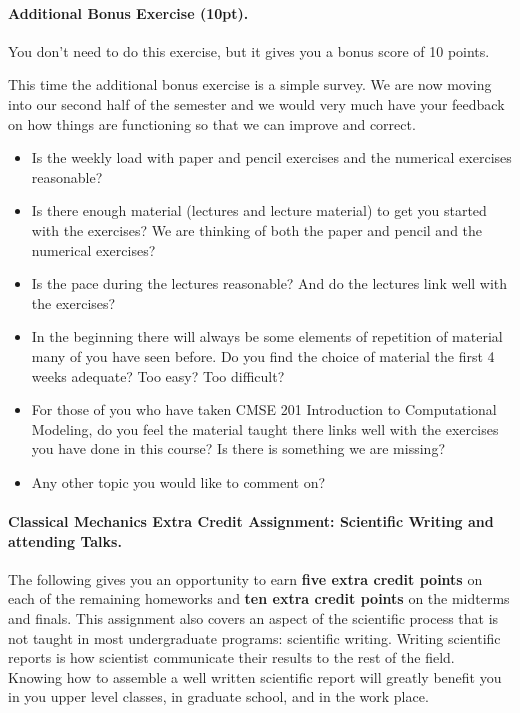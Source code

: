 \documentclass[%
oneside,                 %
final,                   %
10pt]{article}
\begin{document}
\noindent
\paragraph{Additional Bonus Exercise (10pt).}
You don't need to do this exercise, but it gives you a bonus score of 10 points.

This time the additional bonus exercise is a simple survey. We are now moving
into our second half of the semester and we would very much have your feedback on how
things are functioning so that we can improve and correct. 

\begin{itemize}
\item Is the weekly load with paper and pencil exercises and the numerical exercises reasonable?

\item Is there enough material (lectures and lecture material) to get you started with the exercises?  We are thinking of both the paper and pencil and the numerical exercises?

\item Is the pace during the lectures reasonable? And do the lectures link well with the exercises?

\item In the beginning there will always be some elements of repetition of material many of you have seen before. Do you find the choice of material the first 4 weeks adequate? Too easy? Too difficult?

\item For those of you who have taken CMSE 201 Introduction to Computational Modeling, do you feel the material taught there links well with the exercises you have done in this course? Is there is something we are missing?

\item Any other topic you would like to comment on?
\end{itemize}

\noindent
\paragraph{Classical Mechanics Extra Credit Assignment: Scientific Writing and attending Talks.}
The following gives you an opportunity to earn \textbf{five extra credit
points} on each of the remaining homeworks and \textbf{ten extra credit points}
on the midterms and finals.  This assignment also covers an aspect of
the scientific process that is not taught in most undergraduate
programs: scientific writing.  Writing scientific reports is how
scientist communicate their results to the rest of the field.  Knowing
how to assemble a well written scientific report will greatly benefit
you in you upper level classes, in graduate school, and in the work
place.
\end{document}
